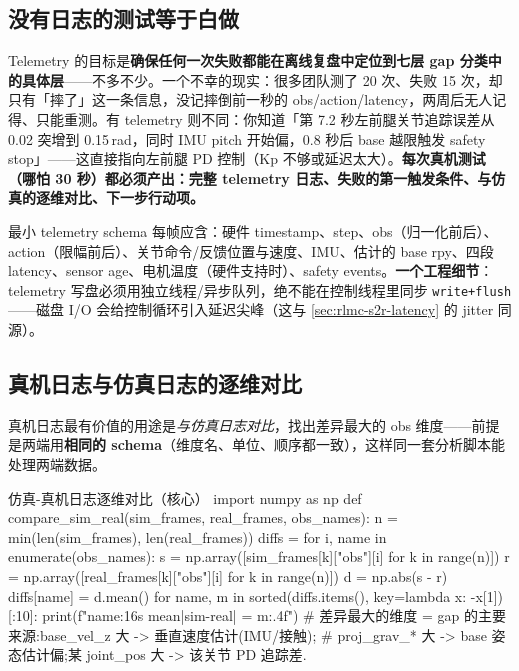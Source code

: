 \subsection{没有日志的测试等于白做}
\label{sec:rlmc-s2r-telemetry-why}

\begin{insight}\label{ins:rlmc-s2r-telemetry}
Telemetry 的目标是\textbf{确保任何一次失败都能在离线复盘中定位到七层 gap 分类中的具体层}——不多不少。一个不幸的现实：很多团队测了 20 次、失败 15 次，却只有「摔了」这一条信息，没记摔倒前一秒的 obs/action/latency，两周后无人记得、只能重测。有 telemetry 则不同：你知道「第 7.2 秒左前腿关节追踪误差从 0.02 突增到 0.15\,rad，同时 IMU pitch 开始偏，0.8 秒后 base 越限触发 safety stop」——这直接指向左前腿 PD 控制（Kp 不够或延迟太大）。\textbf{每次真机测试（哪怕 30 秒）都必须产出：完整 telemetry 日志、失败的第一触发条件、与仿真的逐维对比、下一步行动项。}
\end{insight}

最小 telemetry schema 每帧应含：硬件 timestamp、step、obs（归一化前后）、action（限幅前后）、关节命令/反馈位置与速度、IMU、估计的 base rpy、四段 latency、sensor age、电机温度（硬件支持时）、safety events。\textbf{一个工程细节}：telemetry 写盘必须用独立线程/异步队列，绝不能在控制线程里同步 \verb|write+flush|——磁盘 I/O 会给控制循环引入延迟尖峰（这与 \cref{sec:rlmc-s2r-latency} 的 jitter 同源）。

\subsection{真机日志与仿真日志的逐维对比}
\label{sec:rlmc-s2r-compare}

真机日志最有价值的用途是\emph{与仿真日志对比}，找出差异最大的 obs 维度——前提是两端用\textbf{相同的 schema}（维度名、单位、顺序都一致），这样同一套分析脚本能处理两端数据。

\begin{codebox}[Python]{仿真-真机日志逐维对比（核心）}
import numpy as np
def compare_sim_real(sim_frames, real_frames, obs_names):
    n = min(len(sim_frames), len(real_frames))
    diffs = {}
    for i, name in enumerate(obs_names):
        s = np.array([sim_frames[k]["obs"][i] for k in range(n)])
        r = np.array([real_frames[k]["obs"][i] for k in range(n)])
        d = np.abs(s - r)
        diffs[name] = d.mean()
    for name, m in sorted(diffs.items(), key=lambda x: -x[1])[:10]:
        print(f"{name:16s} mean|sim-real| = {m:.4f}")
    # 差异最大的维度 = gap 的主要来源:base_vel_z 大 -> 垂直速度估计(IMU/接触);
    #   proj_grav_* 大 -> base 姿态估计偏;某 joint_pos 大 -> 该关节 PD 追踪差.
\end{codebox}

